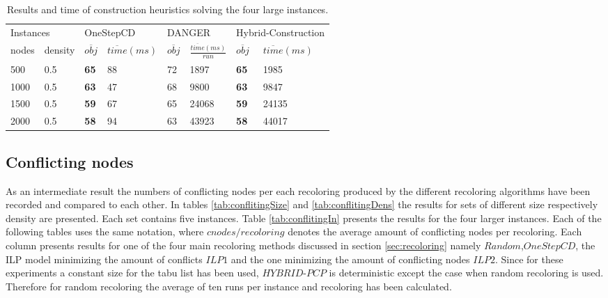       \begin{table}[h]
      \caption{Results and time of construction heuristics solving the four large instances.}
\begin{center}
      \begin{tabular}{|l|l||l|l||l|l||l|l|}\hline
      \multicolumn{2}{|l||}{Instances}&\multicolumn{2}{|l||}{OneStepCD}&\multicolumn{2}{|l||}{DANGER}&\multicolumn{2}{|l|}{Hybrid-Construction}\\
      \cline{1-8}
      nodes & density & $\overline{obj}$ & $\overline{time}(ms)$ & $\overline{obj}$ & $\frac{\overline{time}(ms)}{run}$ & $\overline{obj}$ & $\overline{time}(ms)$\\
      \hline
	  500 & 0.5 		& \textbf{65} & 88 		 	& 72	& 1897  	& \textbf{65} & 1985\\
	  1000 & 0.5 		& \textbf{63} & 47 		 	& 68	& 9800  	& \textbf{63} & 9847\\
	  1500 & 0.5 		& \textbf{59} & 67 		 	& 65	& 24068  	& \textbf{59} & 24135\\
	  2000 & 0.5 		& \textbf{58} & 94 		 	& 63	& 43923  	& \textbf{58} & 44017\\
	  \hline
	  \end{tabular}
\end{center}
      \label{tab:constructionCompareIN}
      \end{table}


\subsection{Conflicting nodes}
As an intermediate result the numbers of conflicting nodes per each recoloring produced by the different recoloring algorithms have been recorded and compared to each other. In tables \ref{tab:conflitingSize} and \ref{tab:conflitingDens} the results for sets of different size respectively density are presented. Each set contains five instances. Table \ref{tab:conflitingIn} presents the results for the four larger instances. Each of the following tables uses the same notation, where $\mathit{cnodes/recoloring}$ denotes the average amount of conflicting nodes per recoloring. Each column presents results for one of the four main recoloring methods discussed in section \ref{sec:recoloring} namely $\mathit{Random}$,$\mathit{OneStepCD}$, the ILP model minimizing the amount of conflicts $\mathit{ILP1}$ and the one minimizing the amount of conflicting nodes $\mathit{ILP2}$. Since for these experiments a constant size for the tabu list has been used, $\mathit{HYBRID}$-$\mathit{PCP}$ is deterministic except the case when random recoloring is used. Therefore for random recoloring the average of ten runs per instance and recoloring has been calculated.\\


